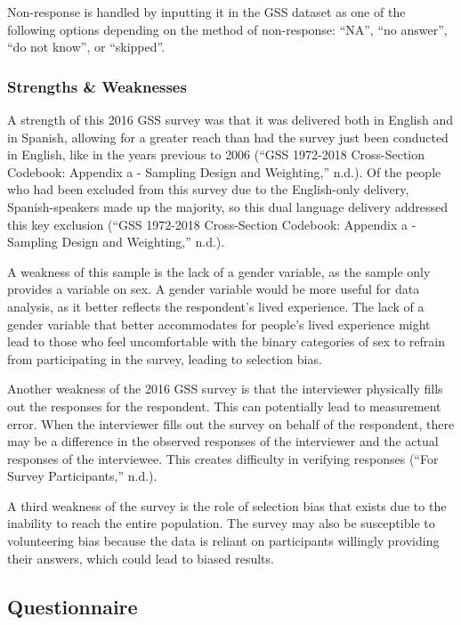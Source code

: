 \documentclass[
]{article}
\begin{document}
Non-response is handled by inputting it in the GSS dataset as one of the
following options depending on the method of non-response: ``NA'', ``no
answer'', ``do not know'', or ``skipped''.

\hypertarget{strengths-weaknesses}{%
\subsubsection{Strengths \& Weaknesses}\label{strengths-weaknesses}}

A strength of this 2016 GSS survey was that it was delivered both in
English and in Spanish, allowing for a greater reach than had the survey
just been conducted in English, like in the years previous to 2006
({``GSS 1972-2018 Cross-Section Codebook: Appendix a - Sampling Design
and Weighting,''} n.d.). Of the people who had been excluded from this
survey due to the English-only delivery, Spanish-speakers made up the
majority, so this dual language delivery addressed this key exclusion
({``GSS 1972-2018 Cross-Section Codebook: Appendix a - Sampling Design
and Weighting,''} n.d.).

A weakness of this sample is the lack of a gender variable, as the
sample only provides a variable on sex. A gender variable would be more
useful for data analysis, as it better reflects the respondent's lived
experience. The lack of a gender variable that better accommodates for
people's lived experience might lead to those who feel uncomfortable
with the binary categories of sex to refrain from participating in the
survey, leading to selection bias.

Another weakness of the 2016 GSS survey is that the interviewer
physically fills out the responses for the respondent. This can
potentially lead to measurement error. When the interviewer fills out
the survey on behalf of the respondent, there may be a difference in the
observed responses of the interviewer and the actual responses of the
interviewee. This creates difficulty in verifying responses ({``For
Survey Participants,''} n.d.).

A third weakness of the survey is the role of selection bias that exists
due to the inability to reach the entire population. The survey may also
be susceptible to volunteering bias because the data is reliant on
participants willingly providing their answers, which could lead to
biased results.

\hypertarget{sec-questionnaire}{%
\subsection{Questionnaire}\label{sec-questionnaire}}
\end{document}
